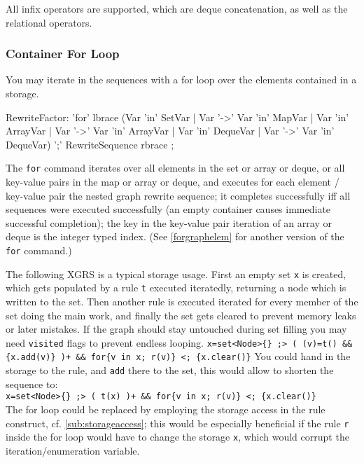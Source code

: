 All infix operators are supported, which are deque concatenation, as well as the relational operators.

\subsubsection*{Container For Loop}

You may iterate in the sequences with a for loop over the elements contained in a storage.

\begin{rail}
  RewriteFactor:
    'for' lbrace (Var 'in' SetVar | Var '->' Var 'in' MapVar | Var 'in' ArrayVar | Var '->' Var 'in' ArrayVar | Var 'in' DequeVar | Var '->' Var 'in' DequeVar) ';' RewriteSequence rbrace
    ;
\end{rail}\label{forstorage}

The \texttt{for} command iterates over all elements in the set or array or deque, or all key-value pairs in the map or array or deque, and executes for each element / key-value pair the nested graph rewrite sequence; it completes successfully iff all sequences were executed successfully (an empty container causes immediate successful completion); the key in the key-value pair iteration of an array or deque is the integer typed index. (See \ref{forgraphelem} for another version of the \texttt{for} command.)

\begin{example}
The following XGRS is a typical storage usage.
First an empty set \texttt{x} is created, which gets populated by a rule \texttt{t} executed iteratedly, returning a node which is written to the set.
Then another rule is executed iterated for every member of the set doing the main work, and finally the set gets cleared to prevent memory leaks or later mistakes.
If the graph should stay untouched during set filling you may need \texttt{visited} flags to prevent endless looping.
\verb#x=set<Node>{} ;> ( (v)=t() && {x.add(v)} )+ && for{v in x; r(v)} <; {x.clear()}#
You could hand in the storage to the rule, and \texttt{add} there to the set, this would allow to shorten the sequence to:\\
\verb#x=set<Node>{} ;> ( t(x) )+ && for{v in x; r(v)} <; {x.clear()}#\\
The for loop could be replaced by employing the storage access in the rule construct, cf. \ref{sub:storageaccess}; this would be especially beneficial if the rule \texttt{r} inside the for loop would have to change the storage \texttt{x}, which would corrupt the iteration/enumeration variable.
\end{example}

